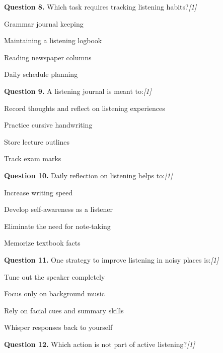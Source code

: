 \documentclass[11pt,a4paper]{article}
\newcommand{\pts}[1]{\hfill   \textit{[#1]}}
\begin{document}
\medskip


\noindent   \textbf{Question 8.} Which task requires tracking listening habits?\pts{1}

\begin{parts}
  \item Grammar journal keeping
  \item Maintaining a listening logbook
  \item Reading newspaper columns
  \item Daily schedule planning
\end{parts}

\medskip


\noindent   \textbf{Question 9.} A listening journal is meant to:\pts{1}

\begin{parts}
  \item Record thoughts and reflect on listening experiences
  \item Practice cursive handwriting
  \item Store lecture outlines
  \item Track exam marks
\end{parts}

\medskip


\noindent   \textbf{Question 10.} Daily reflection on listening helps to:\pts{1}

\begin{parts}
  \item Increase writing speed
  \item Develop self-awareness as a listener
  \item Eliminate the need for note-taking
  \item Memorize textbook facts
\end{parts}

\medskip


\noindent   \textbf{Question 11.} One strategy to improve listening in noisy places is:\pts{1}

\begin{parts}
  \item Tune out the speaker completely
  \item Focus only on background music
  \item Rely on facial cues and summary skills
  \item Whisper responses back to yourself
\end{parts}

\medskip


\noindent   \textbf{Question 12.} Which action is not part of active listening?\pts{1}
\end{document}
